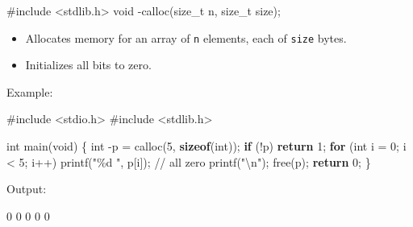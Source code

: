 \documentclass[
  letterpaper,
  DIV=11,
  numbers=noendperiod]{scrreprt}
\newenvironment{Shaded}{\begin{snugshade}}{\end{snugshade}}
\newcommand{\CommentTok}[1]{\textcolor[rgb]{0.37,0.37,0.37}{#1}}
\newcommand{\ControlFlowTok}[1]{\textcolor[rgb]{0.00,0.23,0.31}{\textbf{#1}}}
\newcommand{\DataTypeTok}[1]{\textcolor[rgb]{0.68,0.00,0.00}{#1}}
\newcommand{\DecValTok}[1]{\textcolor[rgb]{0.68,0.00,0.00}{#1}}
\newcommand{\ExtensionTok}[1]{\textcolor[rgb]{0.00,0.23,0.31}{#1}}
\newcommand{\ImportTok}[1]{\textcolor[rgb]{0.00,0.46,0.62}{#1}}
\newcommand{\KeywordTok}[1]{\textcolor[rgb]{0.00,0.23,0.31}{\textbf{#1}}}
\newcommand{\NormalTok}[1]{\textcolor[rgb]{0.00,0.23,0.31}{#1}}
\newcommand{\OperatorTok}[1]{\textcolor[rgb]{0.37,0.37,0.37}{#1}}
\newcommand{\PreprocessorTok}[1]{\textcolor[rgb]{0.68,0.00,0.00}{#1}}
\newcommand{\SpecialCharTok}[1]{\textcolor[rgb]{0.37,0.37,0.37}{#1}}
\newcommand{\StringTok}[1]{\textcolor[rgb]{0.13,0.47,0.30}{#1}}
\providecommand{\tightlist}{%
  \setlength{\itemsep}{0pt}\setlength{\parskip}{0pt}}
\begin{document}
\begin{Shaded}
\begin{Highlighting}[]
\PreprocessorTok{\#include }\ImportTok{\textless{}stdlib.h\textgreater{}}
\DataTypeTok{void} \OperatorTok{{-}}\NormalTok{calloc}\OperatorTok{(}\DataTypeTok{size\_t}\NormalTok{ n}\OperatorTok{,} \DataTypeTok{size\_t}\NormalTok{ size}\OperatorTok{);}
\end{Highlighting}
\end{Shaded}

\begin{itemize}
\tightlist
\item
  Allocates memory for an array of \texttt{n} elements, each of
  \texttt{size} bytes.
\item
  Initializes all bits to zero.
\end{itemize}

Example:

\begin{Shaded}
\begin{Highlighting}[]
\PreprocessorTok{\#include }\ImportTok{\textless{}stdio.h\textgreater{}}
\PreprocessorTok{\#include }\ImportTok{\textless{}stdlib.h\textgreater{}}

\DataTypeTok{int}\NormalTok{ main}\OperatorTok{(}\DataTypeTok{void}\OperatorTok{)} \OperatorTok{\{}
    \DataTypeTok{int} \OperatorTok{{-}}\NormalTok{p }\OperatorTok{=}\NormalTok{ calloc}\OperatorTok{(}\DecValTok{5}\OperatorTok{,} \KeywordTok{sizeof}\OperatorTok{(}\DataTypeTok{int}\OperatorTok{));}
    \ControlFlowTok{if} \OperatorTok{(!}\NormalTok{p}\OperatorTok{)} \ControlFlowTok{return} \DecValTok{1}\OperatorTok{;}
    \ControlFlowTok{for} \OperatorTok{(}\DataTypeTok{int}\NormalTok{ i }\OperatorTok{=} \DecValTok{0}\OperatorTok{;}\NormalTok{ i }\OperatorTok{\textless{}} \DecValTok{5}\OperatorTok{;}\NormalTok{ i}\OperatorTok{++)}\NormalTok{ printf}\OperatorTok{(}\StringTok{"}\SpecialCharTok{\%d}\StringTok{ "}\OperatorTok{,}\NormalTok{ p}\OperatorTok{[}\NormalTok{i}\OperatorTok{]);} \CommentTok{// all zero}
\NormalTok{    printf}\OperatorTok{(}\StringTok{"}\SpecialCharTok{\textbackslash{}n}\StringTok{"}\OperatorTok{);}
\NormalTok{    free}\OperatorTok{(}\NormalTok{p}\OperatorTok{);}
    \ControlFlowTok{return} \DecValTok{0}\OperatorTok{;}
\OperatorTok{\}}
\end{Highlighting}
\end{Shaded}

Output:

\begin{Shaded}
\begin{Highlighting}[]
\ExtensionTok{0}\NormalTok{ 0 0 0 0}
\end{Highlighting}
\end{Shaded}
\end{document}
